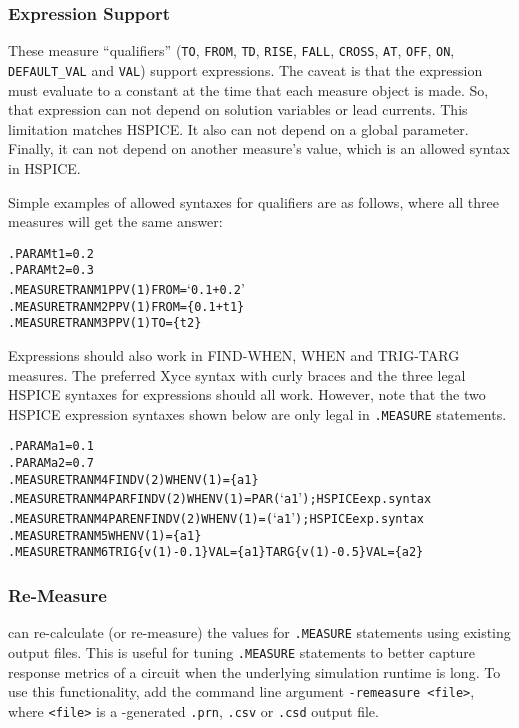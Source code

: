 \subsubsection{Expression Support}
These measure ``qualifiers'' (\texttt{TO}, \texttt{FROM}, \texttt{TD},
\texttt{RISE}, \texttt{FALL}, \texttt{CROSS}, \texttt{AT}, \texttt{OFF},
\texttt{ON}, \texttt{DEFAULT\_VAL} and \texttt{VAL}) support expressions.
The caveat is that the expression must evaluate to a constant at the time
that each measure object is made.  So, that expression can not depend
on solution variables or lead currents.  This limitation matches HSPICE.
It also can not depend on a global parameter.  Finally, it can not depend
on another measure's value, which is an allowed syntax in HSPICE.

Simple examples of allowed syntaxes for qualifiers are as follows, where
all three measures will get the same answer:
\begin{alltt}
.PARAM t1=0.2
.PARAM t2=0.3
.MEASURE TRAN M1 PP V(1) FROM=`0.1+0.2'
.MEASURE TRAN M2 PP V(1) FROM=\{0.1+t1\}
.MEASURE TRAN M3 PP V(1) TO=\{t2\}
\end{alltt}
Expressions should also work in FIND-WHEN, WHEN and TRIG-TARG measures. The
preferred Xyce syntax with curly braces and the three legal HSPICE syntaxes
for expressions should all work.  However, note that the two HSPICE
expression syntaxes shown below are only legal in \Xyce{} \texttt{.MEASURE}
statements.
\begin{alltt}
.PARAM a1=0.1
.PARAM a2=0.7
.MEASURE TRAN M4 FIND V(2) WHEN V(1)=\{a1\}
.MEASURE TRAN M4PAR FIND V(2) WHEN V(1)=PAR(`a1') ; HSPICE exp. syntax
.MEASURE TRAN M4PAREN FIND V(2) WHEN V(1)=(`a1')  ; HSPICE exp. syntax
.MEASURE TRAN M5 WHEN V(1)=\{a1\}
.MEASURE TRAN M6 TRIG \{v(1)-0.1\} VAL=\{a1\} TARG \{v(1)-0.5\} VAL=\{a2\}
\end{alltt}

\subsubsection{Re-Measure}
\label{Measure_ReMeasure}
\Xyce{} can re-calculate (or re-measure) the values for {\tt .MEASURE}
statements using existing \Xyce{} output files.  This is useful for
tuning {\tt .MEASURE} statements to better capture response metrics of
a circuit when the underlying simulation runtime is long.  To use this
functionality, add the command line argument {\tt -remeasure <file>},
where {\tt <file>} is a \Xyce{}-generated {\tt .prn}, {\tt .csv} or
{\tt .csd} output file.

